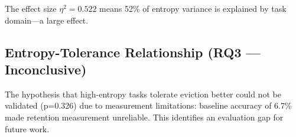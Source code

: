 The effect size $\eta^2 = 0.522$ means 52\% of entropy variance is explained by task domain---a large effect.

\subsection{Entropy-Tolerance Relationship (RQ3 --- Inconclusive)}

The hypothesis that high-entropy tasks tolerate eviction better could not be validated (p=0.326) due to measurement limitations: baseline accuracy of 6.7\% made retention measurement unreliable. This identifies an evaluation gap for future work.
